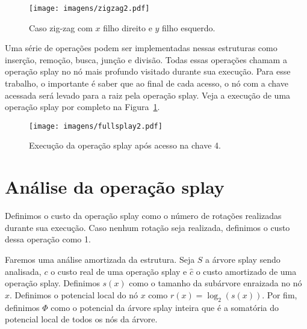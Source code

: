 {\begin{figure}[H]
\begin{comment}
            \begin{scope}[xshift=12cm, local bounding box=scope3]
                \Tree [.$x$ [.$y$ \node[alpha]{a}; \node[alpha]{b};] [.$z$  \node[alpha]{c}; \node[alpha]{d};]]
            \end{scope}
                
            \draw[->] ([yshift=-0.5*\ht\strutbox,xshift=0.3cm]scope2.east) -- node [n] {} ([yshift=-0.5*\ht\strutbox,xshift=-0.3cm]scope3.west);
                
            \draw[->] ([yshift=-3.67cm, xshift=0.67cm]scope2.north) arc (-18:198:0.7cm);
                \draw[->,red] ([yshift=-3.69cm, xshift=-0.82cm]scope2.north) arc (198:-18:0.86cm);
                
    \end{tikzpicture}
    \end{comment}
    \texttt{[image: imagens/zigzag2.pdf]}
    \caption{Caso zig-zag com $x$ filho direito e $y$ filho esquerdo.}
\end{figure}
        
}

Uma série de operações podem ser implementadas nessas estruturas como inserção, remoção, busca, junção e divisão. Todas essas operações chamam a operação splay no nó mais profundo visitado durante sua execução. Para esse trabalho, o importante é saber que ao final de cada acesso, o nó com a chave acessada será levado para a raiz pela operação splay. Veja a execução de uma operação splay por completo na Figura~\ref{fig:fullsplay}.

\begin{figure}
    \texttt{[image: imagens/fullsplay2.pdf]}
    \caption{Execução da operação splay após acesso na chave 4.}
\label{fig:fullsplay}
\end{figure}

\section{Análise da operação splay}

Definimos o custo da operação splay como o número de rotações realizadas durante sua execução. Caso nenhum rotação seja realizada, definimos o custo dessa operação como 1. 

Faremos uma análise amortizada da estrutura. Seja $S$ a árvore splay sendo analisada, $c$ o custo real de uma operação splay e \( \hat{c}\) o custo amortizado de uma operação splay. Definimos $s(x)$ como o tamanho da subárvore enraizada no nó $x$. Definimos o potencial local do nó $x$ como $r(x) = \log_2(s(x))$. Por fim, definimos $\Phi$ como o potencial da árvore splay inteira que é a somatória do potencial local de todos os nós da árvore.

